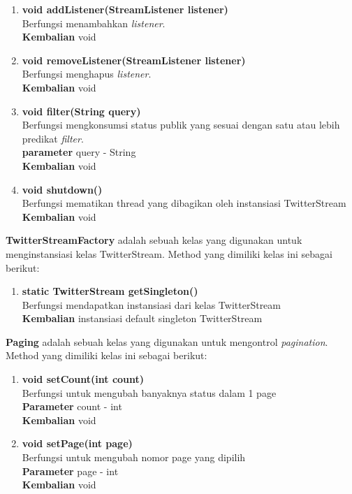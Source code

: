 \begin{enumerate}
	\item \textbf{void addListener(StreamListener listener)}\\
	Berfungsi menambahkan \textit{listener}.\\
	\textbf{Kembalian} void
	\item \textbf{void removeListener(StreamListener listener)}\\
	Berfungsi menghapus \textit{listener}.\\
	\textbf{Kembalian} void
	\item \textbf{void filter(String query)}\\	
	Berfungsi mengkonsumsi status publik yang sesuai dengan satu atau lebih predikat \textit{filter}.\\
	\textbf{parameter} query - String\\
	\textbf{Kembalian} void
	\item \textbf{void shutdown()}\\
	Berfungsi mematikan thread yang dibagikan oleh instansiasi TwitterStream\\
	\textbf{Kembalian} void
\end{enumerate}
\textbf{TwitterStreamFactory} adalah sebuah kelas yang digunakan untuk menginstansiasi kelas TwitterStream. Method yang dimiliki kelas ini sebagai berikut:
\begin{enumerate}
	\item \textbf{static TwitterStream getSingleton()}\\
	Berfungsi mendapatkan instansiasi dari kelas TwitterStream\\
	\textbf{Kembalian} instansiasi default singleton TwitterStream
\end{enumerate}
\textbf{Paging} adalah sebuah kelas yang digunakan untuk mengontrol \textit{pagination}. Method yang dimiliki kelas ini sebagai berikut:
\begin{enumerate}
	\item \textbf{void setCount(int count)}\\
	Berfungsi untuk mengubah banyaknya status dalam 1 page\\
	\textbf{Parameter} count - int\\
	\textbf{Kembalian} void
	\item \textbf{void setPage(int page)}\\
	Berfungsi untuk mengubah nomor page yang dipilih\\
	\textbf{Parameter} page - int\\
	\textbf{Kembalian} void
\end{enumerate}
